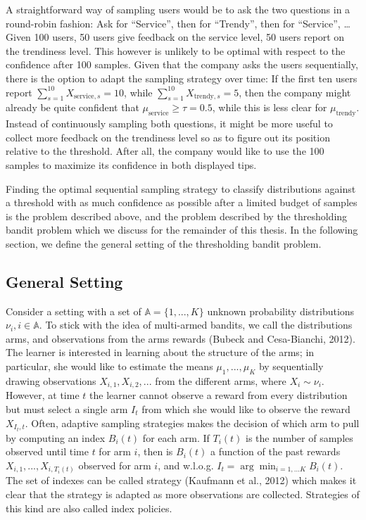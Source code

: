 \documentclass[11pt,]{article}
\begin{document}
A straightforward way of sampling users would be to ask the two
questions in a round-robin fashion: Ask for ``Service'', then for
``Trendy'', then for ``Service'', \ldots{} Given 100 users, 50 users
give feedback on the service level, 50 users report on the trendiness
level. This however is unlikely to be optimal with respect to the
confidence after 100 samples. Given that the company asks the users
sequentially, there is the option to adapt the sampling strategy over
time: If the first ten users report
\(\sum_{s=1}^{10}X_{\text{service},s}=10\), while
\(\sum_{s=1}^{10}X_{\text{trendy},s}=5\), then the company might already
be quite confident that \(\mu_{\text{service}} \geq \tau = 0.5\), while
this is less clear for \(\mu_{\text{trendy}}\). Instead of continuously
sampling both questions, it might be more useful to collect more
feedback on the trendiness level so as to figure out its position
relative to the threshold. After all, the company would like to use the
100 samples to maximize its confidence in both displayed tips.

Finding the optimal sequential sampling strategy to classify
distributions against a threshold with as much confidence as possible
after a limited budget of samples is the problem described above, and
the problem described by the thresholding bandit problem which we
discuss for the remainder of this thesis. In the following section, we
define the general setting of the thresholding bandit problem.

\subsection{\texorpdfstring{General Setting
\label{sec:Setup}}{General Setting }}\label{general-setting}

Consider a setting with a set of \(\mathbb{A}=\{1, ..., K\}\) unknown
probability distributions \(\nu_i, i \in \mathbb{A}\). To stick with the
idea of multi-armed bandits, we call the distributions arms, and
observations from the arms rewards (Bubeck and Cesa-Bianchi, 2012). The
learner is interested in learning about the structure of the arms; in
particular, she would like to estimate the means \(\mu_1, ..., \mu_K\)
by sequentially drawing observations \(X_{i,1}, X_{i,2}, ...\) from the
different arms, where \(X_{i} \sim \nu_i\). However, at time \(t\) the
learner cannot observe a reward from every distribution but must select
a single arm \(I_t\) from which she would like to observe the reward
\(X_{I_t,t}\). Often, adaptive sampling strategies makes the decision of
which arm to pull by computing an index \(B_i(t)\) for each arm. If
\(T_i(t)\) is the number of samples observed until time \(t\) for arm
\(i\), then is \(B_i(t)\) a function of the past rewards
\(X_{i,1}, ..., X_{i,T_i(t)}\) observed for arm \(i\), and w.l.o.g.
\(I_t = \arg \min_{i = 1,...K} B_i(t)\). The set of indexes can be
called strategy (Kaufmann et al., 2012) which makes it clear that the
strategy is adapted as more observations are collected. Strategies of
this kind are also called index policies.
\end{document}
